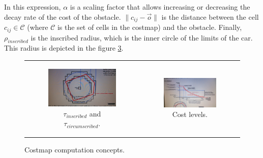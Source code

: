 In this expression, $\alpha$ is a scaling factor that allows increasing or decreasing the decay rate of the cost of the obstacle. $\|c_{ij}-\vec{o}\|$ is the distance between the cell $c_{ij} \in \mathcal{C}$ (where $\mathcal{C}$ is the set of cells in the costmap) and the obstacle. Finally, $\rho_{inscribed}$ is the inscribed radius, which is the inner circle of the limits of the car. This radius is depicted in the figure \ref{fig:cp07_costmap_concepts}.

\begin{figure}[h!]
\begin{tabular}{cc}
  \begin{subfigure}[b]{0.5\textwidth}
    \centering
    \includegraphics[width=\textwidth, trim=50 40 80 60,clip]{inscribed_circumscribed}
    \caption{$\tau_{inscribed}$ and $\tau_{circumscribed}$.}
    \label{fig:cp07_inscribed_circumscribed}
  \end{subfigure} &
  \begin{subfigure}[b]{0.5\textwidth}
    \centering
    \includegraphics[width=\textwidth, trim=50 40 80 60,clip]{cost_levels}
    \caption{Cost levels.}
    \label{fig:cp07_cost_levels}
  \end{subfigure}%
\end{tabular}
\caption{Costmap computation concepts.}\label{fig:cp07_costmap_concepts}
\end{figure}

